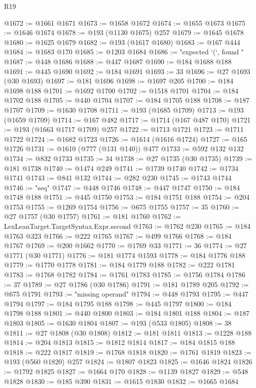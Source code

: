 \begin{lexlean}{R19}
\begin{coremodule}
@1672 := @1661 @1671
@1673 := @1658 @1672
@1674 := @1655 @1673
@1675 := @1646 @1674
@1678 := @193 (@1130 @1675) @257
@1679 := @1645 @1678
@1680 := @1625 @1679
@1682 := @193 (@1617 @1680)
@1683 := @167 @444
@1684 := @1683 @170
@1685 := @1203 @1684
@1686 := "expected `(`, found "
@1687 := @448 @1686
@1688 := @447 @1687
@1690 := @184 @1688 @188
@1691 := @445 @1690
@1692 := @184 @1691
@1693 := 33
@1696 := @27 @1693 (@30 @1693)
@1697 := @181 @1696
@1698 := @1697 @205
@1700 := @184 @1698 @188
@1701 := @1692 @1700
@1702 := @1518 @1701
@1704 := @184 @1702 @188
@1705 := @440 @1704
@1707 := @184 @1705 @188
@1708 := @187 @1707
@1709 := @1630 @1708
@1711 := @193 (@1685 @1709)
@1713 := @193 (@1659 @1709)
@1714 := @167 @482
@1717 := @1714 (@167 @487 @170)
@1721 := @193 (@1663 @1717 @1709) @257
@1722 := @1713 @1721
@1723 := @1711 @1722
@1724 := @1682 @1723
@1726 := @1614 (@1616 @1724)
@1727 := @165 @1726
@1731 := @1610 (@777 (@131 @140)) @477
@1733 := @592 @132 @132
@1734 := @832 @1733
@1735 := 34
@1738 := @27 @1735 (@30 @1735)
@1739 := @181 @1738
@1740 := @1474 @249
@1741 := @1739 @1740
@1742 := @1734 @1741
@1743 := @841 @132
@1744 := @282 @230
@1745 := @1743 @1744
@1746 := "seq"
@1747 := @448 @1746
@1748 := @447 @1747
@1750 := @184 @1748 @188
@1751 := @445 @1750
@1753 := @184 @1751 @188
@1754 := @204 @1753
@1755 := @1269 @1754
@1756 := @675 @1755
@1757 := 35
@1760 := @27 @1757 (@30 @1757)
@1761 := @181 @1760
@1762 := LexLeanTarget.TargetSyntax.Expr.second
@1763 := @1762 @230
@1765 := @184 @1763 @323
@1766 := @222 @1765
@1767 := @499 @1766
@1768 := @184 @1767
@1769 := @200 @1662
@1770 := @1769 @33
@1771 := 36
@1774 := @27 @1771 (@30 @1771)
@1776 := @181 @1774 @1593
@1778 := @184 @1776 @188
@1779 := @1770 @1778
@1781 := @184 @1779 @188
@1782 := @222 @1781
@1783 := @1768 @1782
@1784 := @1761 @1783
@1785 := @1756 @1784
@1786 := 37
@1789 := @27 @1786 (@30 @1786)
@1791 := @181 @1789 @205
@1792 := @675 @1791
@1793 := "missing operand"
@1794 := @448 @1793
@1795 := @447 @1794
@1797 := @184 @1795 @188
@1798 := @445 @1797
@1800 := @184 @1798 @188
@1801 := @440 @1800
@1803 := @184 @1801 @188
@1804 := @187 @1803
@1805 := @1630 @1804
@1807 := @193 (@533 @1805)
@1808 := 38
@1811 := @27 @1808 (@30 @1808)
@1812 := @181 @1811
@1813 := @1228 @188
@1814 := @204 @1813
@1815 := @1812 @1814
@1817 := @184 @1815 @188
@1818 := @222 @1817
@1819 := @1768 @1818
@1820 := @1761 @1819
@1823 := @193 (@560 @1820) @257
@1824 := @1807 @1823
@1825 := @1646 @1824
@1826 := @1792 @1825
@1827 := @1664 @170
@1828 := @1139 @1827
@1829 := @548 @1828
@1830 := @185 @390
@1831 := @1615 @1830
@1832 := @1665 @1684

\end{coremodule}
\end{lexlean}
